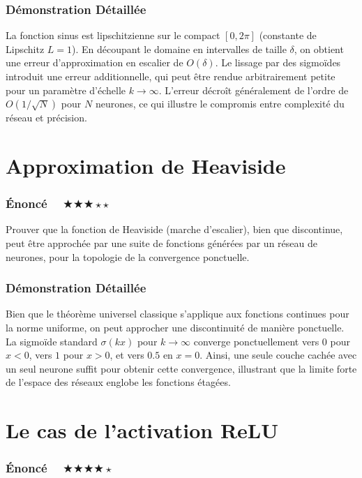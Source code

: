 \documentclass[11pt,a4paper]{article}
\begin{document}
\subsubsection{Démonstration Détaillée}

La fonction sinus est lipschitzienne sur le compact $[0, 2\pi]$ (constante de Lipschitz $L=1$). En découpant le domaine en intervalles de taille $\delta$, on obtient une erreur d'approximation en escalier de $O(\delta)$. Le lissage par des sigmoïdes introduit une erreur additionnelle, qui peut être rendue arbitrairement petite pour un paramètre d'échelle $k \to \infty$. L'erreur décroît généralement de l'ordre de $O(1/\sqrt{N})$ pour $N$ neurones, ce qui illustre le compromis entre complexité du réseau et précision.


\section{Approximation de Heaviside}

\subsubsection{Énoncé $\quad \bigstar\bigstar\bigstar\star\star$}

Prouver que la fonction de Heaviside (marche d'escalier), bien que discontinue, peut être approchée par une suite de fonctions générées par un réseau de neurones, pour la topologie de la convergence ponctuelle.

\subsubsection{Démonstration Détaillée}

Bien que le théorème universel classique s'applique aux fonctions continues pour la norme uniforme, on peut approcher une discontinuité de manière ponctuelle. La sigmoïde standard $\sigma(kx)$ pour $k \to \infty$ converge ponctuellement vers $0$ pour $x<0$, vers $1$ pour $x>0$, et vers $0.5$ en $x=0$. Ainsi, une seule couche cachée avec un seul neurone suffit pour obtenir cette convergence, illustrant que la limite forte de l'espace des réseaux englobe les fonctions étagées.


\section{Le cas de l'activation ReLU}

\subsubsection{Énoncé $\quad \bigstar\bigstar\bigstar\bigstar\star$}
\end{document}
